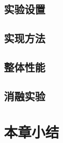 \subsection{实验设置}

\subsection{实现方法}

\subsection{整体性能}

\subsection{消融实验}




\section{本章小结}\label{sec:nmp-conclusion}


